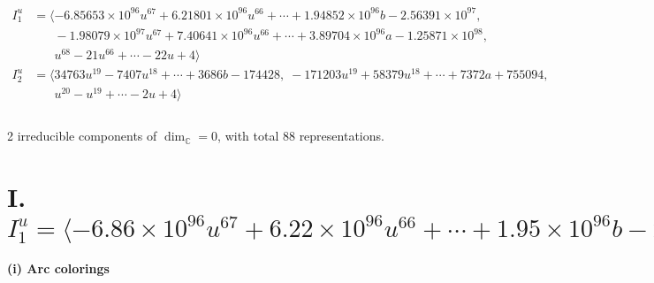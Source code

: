 \documentclass[1p]{elsarticle_modified}
\theoremstyle{definition}
\begin{document}
\begin{align*}
I^u_{1}&=\langle 
-6.85653\times10^{96} u^{67}+6.21801\times10^{96} u^{66}+\cdots+1.94852\times10^{96} b-2.56391\times10^{97},\\
\phantom{I^u_{1}}&\phantom{= \langle  }-1.98079\times10^{97} u^{67}+7.40641\times10^{96} u^{66}+\cdots+3.89704\times10^{96} a-1.25871\times10^{98},\\
\phantom{I^u_{1}}&\phantom{= \langle  }u^{68}-21 u^{66}+\cdots-22 u+4\rangle \\
I^u_{2}&=\langle 
34763 u^{19}-7407 u^{18}+\cdots+3686 b-174428,\;-171203 u^{19}+58379 u^{18}+\cdots+7372 a+755094,\\
\phantom{I^u_{2}}&\phantom{= \langle  }u^{20}- u^{19}+\cdots-2 u+4\rangle \\
\\
\end{align*}
\raggedright * 2 irreducible components of $\dim_{\mathbb{C}}=0$, with total 88 representations.\\
\newpage
\renewcommand{\arraystretch}{1}
\centering \section*{I. $I^u_{1}= \langle -6.86\times10^{96} u^{67}+6.22\times10^{96} u^{66}+\cdots+1.95\times10^{96} b-2.56\times10^{97},\;-1.98\times10^{97} u^{67}+7.41\times10^{96} u^{66}+\cdots+3.90\times10^{96} a-1.26\times10^{98},\;u^{68}-21 u^{66}+\cdots-22 u+4 \rangle$}
\flushleft \textbf{(i) Arc colorings}\\
\end{document}

